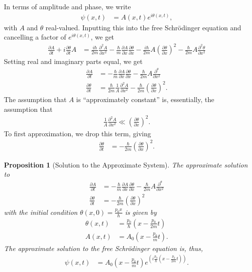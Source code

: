\documentclass[12pt]{extarticle}
\theoremstyle{plain}
\newtheorem*{proposition}{Proposition}%
\theoremstyle{definition}
\theoremstyle{remark}
\begin{document}
  In terms of amplitude and phase, we write
  \begin{align*}
    \psi(x,t) &= A(x,t)e^{i\theta(x,t)},
  \end{align*}
  with $A$ and $\theta$ real-valued. Inputting this into the free Schrödinger equation and cancelling a factor of $e^{i\theta(x,t)}$, we get
  \begin{align*}
    \frac{\partial A}{\partial t} + i\frac{\partial \theta}{\partial t}A &= \frac{i\hbar}{2m}\frac{\partial^2 A}{\partial x^2} - \frac{\hbar}{m}\frac{\partial A}{\partial x}\frac{\partial \theta}{\partial x} - \frac{i\hbar}{2m}A\left(\frac{\partial \theta}{\partial x}\right)^2 - \frac{\hbar}{2m}A\frac{\partial ^2 \theta}{\partial x^2}
  \end{align*}
  Setting real and imaginary parts equal, we get
  \begin{align*}
    \frac{\partial A}{\partial t} &= -\frac{\hbar}{m}\frac{\partial A}{\partial x}\frac{\partial \theta}{\partial x} - \frac{\hbar}{2m}A\frac{\partial ^\theta}{\partial x^2}\\
    \frac{\partial \theta}{\partial t} &= \frac{\hbar}{2m}\frac{1}{A}\frac{\partial ^2A}{\partial x^2} - \frac{\hbar}{2m}\left(\frac{\partial \theta}{\partial x}\right)^2.
  \end{align*}
  The assumption that $A$ is ``approximately constant'' is, essentially, the assumption that
  \begin{align*}
    \frac{1}{A}\frac{\partial ^2A}{\partial x^2}\ll \left(\frac{\partial \theta}{\partial x}\right)^2.
  \end{align*}
  To first approximation, we drop this term, giving
  \begin{align*}
    \frac{\partial \theta}{\partial t} &= -\frac{\hbar}{2m}\left(\frac{\partial \theta}{\partial x}\right)^2.
  \end{align*}
  \begin{proposition}[Solution to the Approximate System]
    The approximate solution to
    \begin{align*}
      \frac{\partial A}{\partial t} &= -\frac{\hbar}{m}\frac{\partial A}{\partial x}\frac{\partial \theta}{\partial x} - \frac{\hbar}{2m}A\frac{\partial ^\theta}{\partial x^2}\\
      \frac{\partial \theta}{\partial t} &= -\frac{\hbar}{2m}\left(\frac{\partial \theta}{\partial x}\right)^2
    \end{align*}
    with the initial condition $\theta(x,0) = \frac{p_0x}{\hbar}$ is given by
    \begin{align*}
      \theta(x,t) &= \frac{p_0}{\hbar}\left(x - \frac{p_0}{2m}t\right)\\
      A(x,t) &= A_0\left(x - \frac{p_0}{m}t\right).
    \end{align*}
    The approximate solution to the free Schrödinger equation is, thus,
    \begin{align*}
      \psi(x,t) &= A_0\left(x - \frac{p_0}{m}t\right)e^{\left(i\frac{p_0}{\hbar}\left(x - \frac{p_0}{2m}t\right)\right)}.
    \end{align*}
  \end{proposition}
\end{document}
